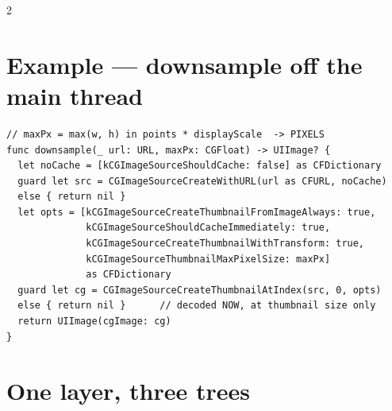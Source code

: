 \documentclass[8pt]{extarticle}
\begin{document}
\begin{multicols}{2}
\section{Example — downsample off the main thread}
\begin{lstlisting}[language=SwiftSheet]
// maxPx = max(w, h) in points * displayScale  -> PIXELS
func downsample(_ url: URL, maxPx: CGFloat) -> UIImage? {
  let noCache = [kCGImageSourceShouldCache: false] as CFDictionary
  guard let src = CGImageSourceCreateWithURL(url as CFURL, noCache)
  else { return nil }
  let opts = [kCGImageSourceCreateThumbnailFromImageAlways: true,
              kCGImageSourceShouldCacheImmediately: true,
              kCGImageSourceCreateThumbnailWithTransform: true,
              kCGImageSourceThumbnailMaxPixelSize: maxPx]
              as CFDictionary
  guard let cg = CGImageSourceCreateThumbnailAtIndex(src, 0, opts)
  else { return nil }      // decoded NOW, at thumbnail size only
  return UIImage(cgImage: cg)
}
\end{lstlisting}

\columnbreak

\section{One layer, three trees}


\end{multicols}
\end{document}
